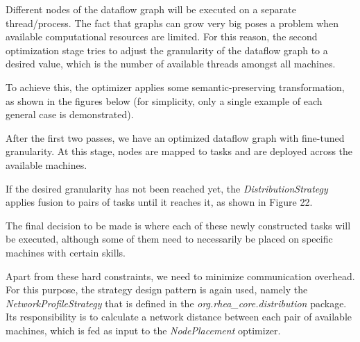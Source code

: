 \documentclass{dithesis}
\begin{document}


Different nodes of the dataflow graph will be executed on a separate thread/process. The fact that graphs can grow very big poses a problem when available computational resources are limited. For this reason, the second optimization stage tries to adjust the granularity of the dataflow graph to a desired value, which is the number of available threads amongst all machines. 

To achieve this, the optimizer applies some semantic-preserving transformation, as shown in the figures below (for simplicity, only a single example of each general case is demonstrated). 



After the first two passes, we have an optimized dataflow graph with fine-tuned granularity. At this stage, nodes are mapped to tasks and are deployed across the available machines. 

If the desired granularity has not been reached yet, the \textit{DistributionStrategy} applies fusion to pairs of tasks until it reaches it, as shown in Figure 22.


The final decision to be made is where each of these newly constructed tasks will be executed, although some of them need to necessarily be placed on specific machines with certain skills. 

Apart from these hard constraints, we need to minimize communication overhead. For this purpose, the strategy design pattern is again used, namely the \textit{NetworkProfileStrategy} that is defined in the \textit{org.rhea\_core.distribution} package. Its responsibility is to calculate a network distance between each pair of available machines, which is fed as input to the \textit{NodePlacement} optimizer. 
\end{document}
